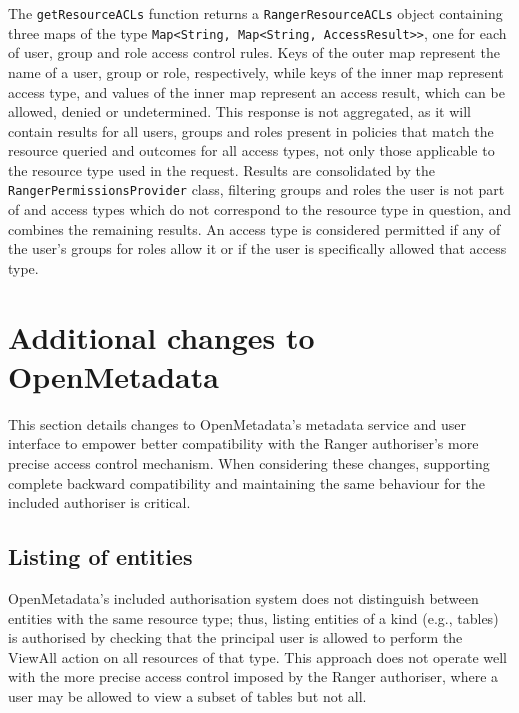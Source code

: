 The \texttt{getResourceACLs} function returns a \texttt{RangerResourceACLs} object containing three maps of the type \texttt{Map<String, Map<String, AccessResult>>}, one for each of user, group and role access control rules. Keys of the outer map represent the name of a user, group or role, respectively, while keys of the inner map represent access type, and values of the inner map represent an access result, which can be allowed, denied or undetermined. This response is not aggregated, as it will contain results for all users, groups and roles present in policies that match the resource queried and outcomes for all access types, not only those applicable to the resource type used in the request. Results are consolidated by the \texttt{RangerPermissionsProvider} class, filtering groups and roles the user is not part of and access types which do not correspond to the resource type in question, and combines the remaining results. An access type is considered permitted if any of the user's groups for roles allow it or if the user is specifically allowed that access type.

\section{Additional changes to OpenMetadata}

This section details changes to OpenMetadata's metadata service and user interface to empower better compatibility with the Ranger authoriser's more precise access control mechanism. When considering these changes, supporting complete backward compatibility and maintaining the same behaviour for the included authoriser is critical.

\subsection{Listing of entities}

OpenMetadata's included authorisation system does not distinguish between entities with the same resource type; thus, listing entities of a kind (e.g., tables) is authorised by checking that the principal user is allowed to perform the ViewAll action on all resources of that type. This approach does not operate well with the more precise access control imposed by the Ranger authoriser, where a user may be allowed to view a subset of tables but not all.

